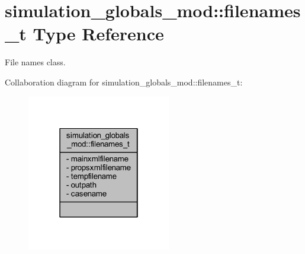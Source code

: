 \hypertarget{structsimulation__globals__mod_1_1filenames__t}{}\section{simulation\+\_\+globals\+\_\+mod\+:\+:filenames\+\_\+t Type Reference}
\label{structsimulation__globals__mod_1_1filenames__t}


File names class.  




Collaboration diagram for simulation\+\_\+globals\+\_\+mod\+:\+:filenames\+\_\+t\+:
\nopagebreak
\begin{figure}[H]
\begin{center}
\leavevmode
\includegraphics[width=178pt]{structsimulation__globals__mod_1_1filenames__t__coll__graph}
\end{center}
\end{figure}
